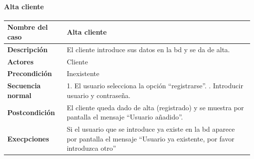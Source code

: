 \paragraph{Alta cliente}
\begin{table}[H]
    \centering
    \begin{tabularx}{0.7\textwidth}{|X|X|}
        \hline
        \rowcolor{lightgray}
        \textbf{Nombre del caso}  & \textbf{Alta cliente}                                                                                                                       \\
        \hline
        \textbf{Descripción}      & El cliente introduce sus datos en la \gls{bd} y se da de alta.                                                                              \\
        \hline
        \textbf{Actores}          & Cliente                                                                                                                                     \\
        \hline
        \textbf{Precondición}     & Inexistente                                                                                                                                 \\
        \hline
        \textbf{Secuencia normal} & 1. El usuario selecciona la opción ``registrarse''. \newline
        2. Introducir usuario y contraseña.                                                                                                                                     \\
        \hline
        \textbf{Postcondición}    & El cliente queda dado de alta (registrado) y se muestra por pantalla el mensaje ``Usuario añadido''.                                        \\
        \hline
        \textbf{Execpciones}      & Si el usuario que se introduce ya existe en la \gls{bd} aparece por pantalla el mensaje ``Usuario ya existente, por favor introduzca otro'' \\
        \hline
    \end{tabularx}
\end{table}
